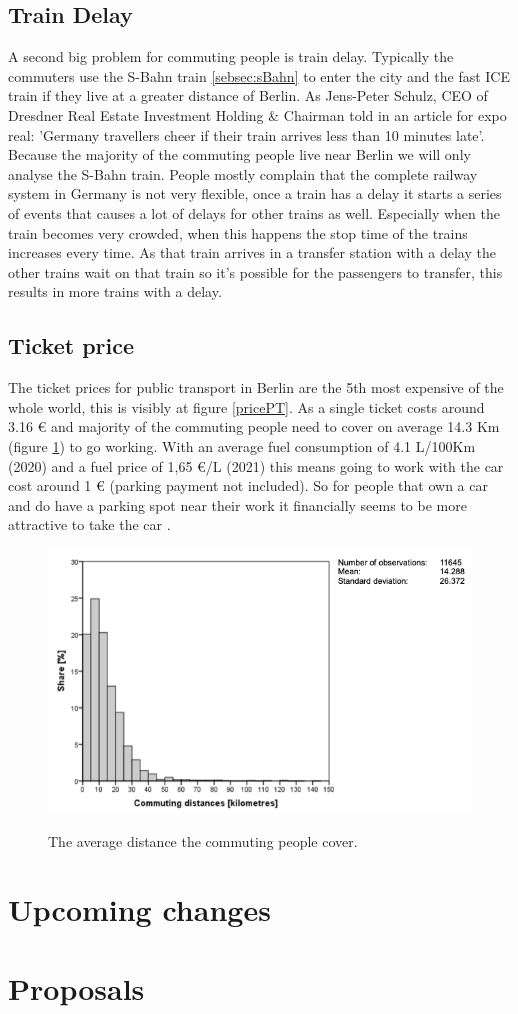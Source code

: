 \subsection{Train Delay}
A second big problem for commuting people is train delay. Typically the commuters use  the S-Bahn train \ref{sebsec:sBahn} to enter the city and the fast ICE train if they live at a greater distance of Berlin. As Jens-Peter Schulz, CEO of Dresdner Real Estate Investment Holding \& Chairman told in an article for expo real: 'Germany travellers cheer if their train arrives less than 10 minutes late'. Because the majority of the commuting people live near Berlin we will only analyse the S-Bahn train. People mostly complain that the complete railway system in Germany is not very flexible, once a train has a delay it starts a series of events that causes a lot of delays for other trains as well. Especially when the train becomes very crowded, when this happens the stop time of the trains increases every time. As that train arrives in a transfer station with a delay the other trains wait on that train so it's possible for the passengers to transfer, this results in more trains with a delay. 

\subsection{Ticket price}
The ticket prices for public transport in Berlin are the 5th most expensive of the whole world, this is visibly at figure \ref{pricePT}. As a single ticket costs around 3.16 € and majority of the commuting people need to cover on average 14.3 Km (figure \ref{averageComDis}) to go working. With an average fuel consumption of 4.1 L/100Km (2020) and a fuel price of  1,65 €/L (2021) this means going to work with the car cost around 1 € (parking payment not included). So for people that own a car and do have a parking spot near their work it financially seems to be more attractive to take the car . 

\begin{figure}[h!]
	\centering
	\includegraphics[width=0.55\textheight]{ProblemsFigures/averageCommutingDistance}
	\label{averageComDis}
	\caption{The average distance the commuting people cover. }
\end{figure}

\section{Upcoming changes}


\section{Proposals}